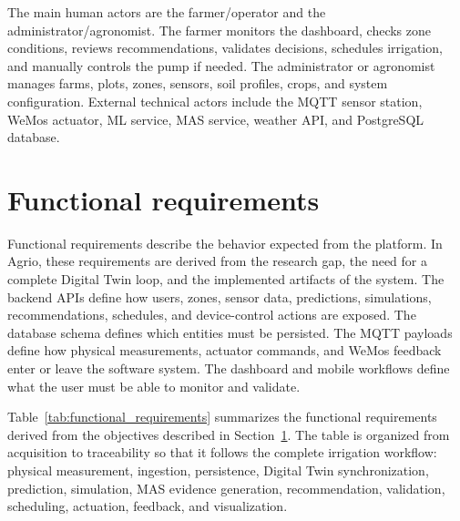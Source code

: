 The main human actors are the farmer/operator and the administrator/agronomist. The farmer monitors the dashboard, checks zone conditions, reviews recommendations, validates decisions, schedules irrigation, and manually controls the pump if needed. The administrator or agronomist manages farms, plots, zones, sensors, soil profiles, crops, and system configuration. External technical actors include the MQTT sensor station, WeMos actuator, ML service, MAS service, weather API, and PostgreSQL database.

\section{Functional requirements}
\label{sec:functional_requirements}

Functional requirements describe the behavior expected from the platform. In Agrio, these requirements are derived from the research gap, the need for a complete Digital Twin loop, and the implemented artifacts of the system. The backend APIs define how users, zones, sensor data, predictions, simulations, recommendations, schedules, and device-control actions are exposed. The database schema defines which entities must be persisted. The MQTT payloads define how physical measurements, actuator commands, and WeMos feedback enter or leave the software system. The dashboard and mobile workflows define what the user must be able to monitor and validate.

Table~\ref{tab:functional_requirements} summarizes the functional requirements derived from the objectives described in Section~\ref{sec:functional_requirements}. The table is organized from acquisition to traceability so that it follows the complete irrigation workflow: physical measurement, ingestion, persistence, Digital Twin synchronization, prediction, simulation, MAS evidence generation, recommendation, validation, scheduling, actuation, feedback, and visualization.

